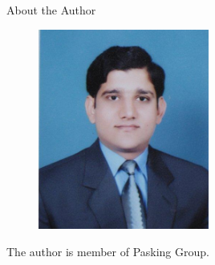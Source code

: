 \cleardoublepage
{}
{}

\begin{center}
\huge  About the Author
\vspace{0.5in}
\begin{figure}[h]
	\centering
		\includegraphics[width=0.50\textwidth]{back/about_the_author/about_the_author.jpg}
	\label{fig:about_the_author}
\end{figure}
\vspace{0.4in}
\normalfont
\end{center}

The author is member of Pasking Group. 